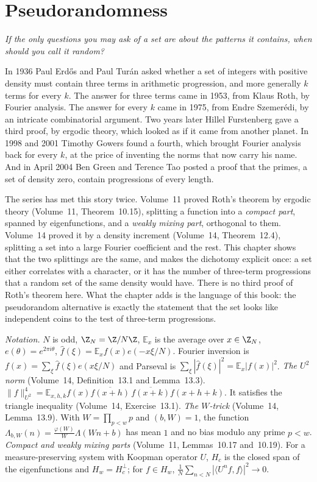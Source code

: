 \chapter{Pseudorandomness}\label{ch:oc-pseudorandom}

\begin{center}\itshape
If the only questions you may ask of a set are about the patterns it contains, when should you call it random?
\end{center}

In 1936 Paul Erd\H{o}s and Paul Tur\'an asked whether a set of integers with positive density must contain three terms in arithmetic progression, and more generally $k$ terms for every $k$. The answer for three terms came in 1953, from Klaus Roth, by Fourier analysis. The answer for every $k$ came in 1975, from Endre Szemer\'edi, by an intricate combinatorial argument. Two years later Hillel Furstenberg gave a third proof, by ergodic theory, which looked as if it came from another planet. In 1998 and 2001 Timothy Gowers found a fourth, which brought Fourier analysis back for every $k$, at the price of inventing the norms that now carry his name. And in April 2004 Ben Green and Terence Tao posted a proof that the primes, a set of density zero, contain progressions of every length.

The series has met this story twice. Volume~11 proved Roth's theorem by ergodic theory (Volume~11, Theorem~10.15), splitting a function into a \emph{compact part}, spanned by eigenfunctions, and a \emph{weakly mixing part}, orthogonal to them. Volume~14 proved it by a density increment (Volume~14, Theorem~12.4), splitting a set into a large Fourier coefficient and the rest. This chapter shows that the two splittings are the same, and makes the dichotomy explicit once: a set either correlates with a character, or it has the number of three-term progressions that a random set of the same density would have. There is no third proof of Roth's theorem here. What the chapter adds is the language of this book: the pseudorandom alternative is exactly the statement that the set looks like independent coins to the test of three-term progressions.

\begin{reminder}
\emph{Notation.} $N$ is odd, $\Z_N=\Z/N\Z$, $\mathbb E_x$ is the average over $x\in\Z_N$, $e(\theta)=e^{2\pi i\theta}$, $\hat f(\xi)=\mathbb E_xf(x)e(-x\xi/N)$. Fourier inversion is $f(x)=\sum_\xi\hat f(\xi)e(x\xi/N)$ and Parseval is $\sum_\xi|\hat f(\xi)|^2=\mathbb E_x|f(x)|^2$.
\emph{The $U^2$ norm} (Volume~14, Definition~13.1 and Lemma~13.3). $\|f\|_{U^2}^4=\mathbb E_{x,h,k}f(x)\overline{f(x+h)}\,\overline{f(x+k)}f(x+h+k)$. It satisfies the triangle inequality (Volume~14, Exercise~13.1).
\emph{The $W$-trick} (Volume~14, Lemma~13.9). With $W=\prod_{p<w}p$ and $(b,W)=1$, the function $\Lambda_{b,W}(n)=\frac{\varphi(W)}W\Lambda(Wn+b)$ has mean $1$ and no bias modulo any prime $p<w$.
\emph{Compact and weakly mixing parts} (Volume~11, Lemmas~10.17 and~10.19). For a measure-preserving system with Koopman operator $U$, $H_c$ is the closed span of the eigenfunctions and $H_w=H_c^\perp$; for $f\in H_w$, $\frac1N\sum_{n<N}|\langle U^nf,f\rangle|^2\to0$.
\end{reminder}

